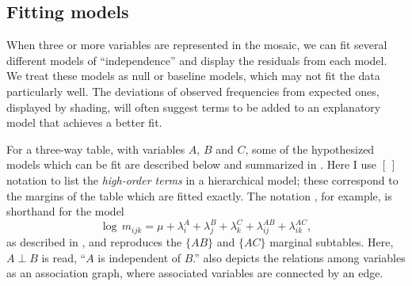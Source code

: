 \subsection{Fitting models}\label{sec:mosaic-fitting}
When three or more variables are
represented in the mosaic, we can fit several different models of
``independence'' and display the residuals from each model.  We treat
these models as null or baseline models, which may not fit the data
particularly well.  The deviations of observed frequencies from
expected ones, displayed by shading, will often suggest terms to be added
to an explanatory model that achieves a better fit.

For a three-way table, with variables $A$, $B$ and $C$, some of the hypothesized models which can be fit are
described below and summarized in .
Here I use $[\,]$ notation to list the \emph{high-order terms} in
a hierarchical \loglin{} model; these correspond to the margins
of the table which are fitted exactly.  The notation ,
for example, is shorthand for the model
\begin{equation*}
  \log \,  m_{ijk}  =
  \mu  +  \lambda_i^A
  +  \lambda_j^B
  +  \lambda_k^C
  +  \lambda_{ij}^{AB}
  +  \lambda_{ik}^{AC}
  \comma
\end{equation*}
as described in , and reproduces the
$\{AB\}$ and $\{AC\}$ marginal subtables.
Here, $A \perp B$ is
read, ``$A$ is independent of $B$.''   also
depicts the relations among variables as an
association graph, where associated variables are connected by an edge.

